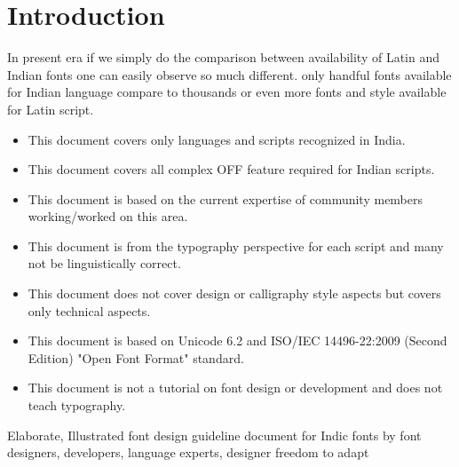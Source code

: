 \chapter{Introduction}



In present era if we simply do the comparison between availability of Latin and
Indian fonts one can easily observe so much different. only handful fonts
available for Indian language compare to thousands or even more fonts and style
available for Latin script.



\begin{itemize}
\item This document covers only languages and scripts recognized in India.
\item This document covers all complex OFF feature required for Indian scripts.
\item This document is based on the current expertise of community members
working/worked on this area.
\item This document is from the typography perspective for each script and many
not be linguistically correct.
\item This document does not cover design or calligraphy style aspects but
covers only technical aspects.
\item This document is based on Unicode 6.2 and ISO/IEC 14496-22:2009
(Second Edition) "Open Font Format" standard.
\item This document is not a tutorial on font design or development and does
not teach typography.
\end{itemize}


Elaborate, Illustrated font design guideline document for Indic fonts by font
designers, developers, language experts, designer freedom to adapt


